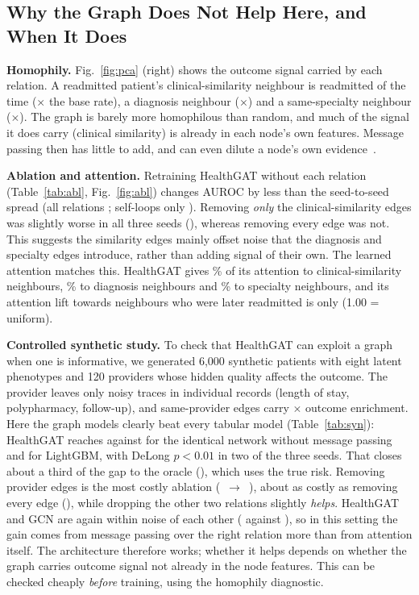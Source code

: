 \documentclass[conference]{IEEEtran}
\newcommand{\inputtable}[1]{\InputIfFileExists{tables/#1.tex}{}{\par\textbf{[table #1 pending]}\par}}
\begin{document}
\inputtable{benchmark}

\subsection{Why the Graph Does Not Help Here, and When It Does}
\textbf{Homophily.} Fig.~\ref{fig:pca} (right) shows the outcome signal carried by each
relation. A readmitted patient's clinical-similarity neighbour is readmitted \homSim{} of the
time (\homLiftSim$\times$ the base rate), a diagnosis neighbour \homDx{}
(\homLiftDx$\times$) and a same-specialty neighbour \homSpec{} (\homLiftSpec$\times$). The
graph is barely more homophilous than random, and much of the signal it does carry (clinical
similarity) is already in each node's own features. Message passing then has little to add, and
can even dilute a node's own evidence~\cite{zhu2020}.

\textbf{Ablation and attention.} Retraining HealthGAT without each relation
(Table~\ref{tab:abl}, Fig.~\ref{fig:abl}) changes AUROC by less than the seed-to-seed spread
(all relations \ablAll; self-loops only \ablNoEdges). Removing \emph{only} the clinical-similarity
edges was slightly worse in all three seeds (\ablNoSim), whereas removing every edge was not.
This suggests the similarity edges mainly offset noise that the diagnosis and specialty edges
introduce, rather than adding signal of their own. The learned attention matches this.
HealthGAT gives \attSim\% of its attention to clinical-similarity neighbours, \attDx\% to
diagnosis neighbours and \attSpec\% to specialty neighbours, and its attention lift towards
neighbours who were later readmitted is only \attLiftPos{} (1.00 = uniform).

\textbf{Controlled synthetic study.} To check that HealthGAT can exploit a graph when one is
informative, we generated 6{,}000 synthetic patients with eight latent phenotypes and 120
providers whose hidden quality affects the outcome. The provider leaves only noisy traces in
individual records (length of stay, polypharmacy, follow-up), and same-provider edges carry
\synHomLiftSpec$\times$ outcome enrichment. Here the graph models clearly beat every tabular
model (Table~\ref{tab:syn}): HealthGAT reaches \synGAT{} against \synMLP{} for the identical
network without message passing and \synLGBM{} for LightGBM, with DeLong $p<0.01$ in two of the
three seeds. That closes about a third of the gap to the oracle (\synOracle), which uses the
true risk. Removing provider edges is the most costly ablation
(\synablAll{}~$\rightarrow$~\synablNoSpec), about as costly as removing every edge
(\synablNoEdges), while dropping the other two relations slightly \emph{helps}. HealthGAT and GCN
are again within noise of each other (\synGAT{} against \synGCN), so in this setting the gain
comes from message passing over the right relation more than from attention itself. The architecture therefore works; whether
it helps depends on whether the graph carries outcome signal not already in the node features.
This can be checked cheaply \emph{before} training, using the homophily diagnostic.
\end{document}
